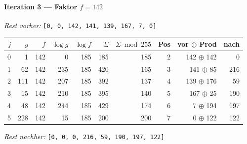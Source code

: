 \paragraph{Iteration 3 — Faktor $f = 142$}
\textit{Rest vorher:} \texttt{[0, 0, 142, 141, 139, 167, 7, 0]}\par
\begin{center}
\footnotesize
\setlength{\tabcolsep}{4pt}
\renewcommand{\arraystretch}{1.1}
\begin{tabular}{r|rr|rrrr|rrr}
\toprule
$j$ & $g$ & $f$ & $\log g$ & $\log f$ & $\Sigma$ & $\Sigma\bmod 255$ & Pos & vor $\oplus$ Prod & nach \\
\midrule
0 & 1 & 142 & 0 & 185 & 185 & 185 & 2 & 142 $\oplus$ 142 & 0 \\
1 & 62 & 142 & 235 & 185 & 420 & 165 & 3 & 141 $\oplus$ 85 & 216 \\
2 & 111 & 142 & 207 & 185 & 392 & 137 & 4 & 139 $\oplus$ 176 & 59 \\
3 & 15 & 142 & 210 & 185 & 395 & 140 & 5 & 167 $\oplus$ 25 & 190 \\
4 & 48 & 142 & 244 & 185 & 429 & 174 & 6 & 7 $\oplus$ 194 & 197 \\
5 & 228 & 142 & 15 & 185 & 200 & 200 & 7 & 0 $\oplus$ 122 & 122 \\
\bottomrule
\end{tabular}
\end{center}
\textit{Rest nachher:} \texttt{[0, 0, 0, 216, 59, 190, 197, 122]}\par\medskip
